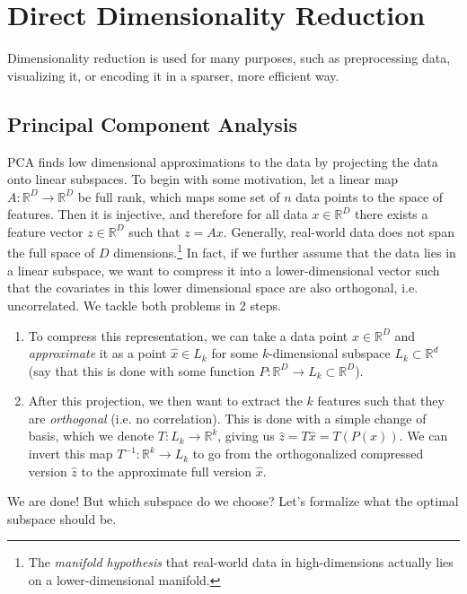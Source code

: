 \section{Direct Dimensionality Reduction} 

  Dimensionality reduction is used for many purposes, such as preprocessing data, visualizing it, or encoding it in a sparser, more efficient way. 

  \subsection{Principal Component Analysis} 
    
    PCA finds low dimensional approximations to the data by projecting the data onto linear subspaces. To begin with some motivation, let a linear map $A: \mathbb{R}^D \rightarrow \mathbb{R}^D$ be full rank, which maps some set of $n$ data points to the space of features. Then it is injective, and therefore for all data $x \in \mathbb{R}^D$ there exists a feature vector $z \in \mathbb{R}^D$ such that $z = Ax$. Generally, real-world data does not span the full space of $D$ dimensions.\footnote{The \textit{manifold hypothesis} that real-world data in high-dimensions actually lies on a lower-dimensional manifold. } In fact, if we further assume that the data lies in a linear subspace, we want to compress it into a lower-dimensional vector such that the covariates in this lower dimensional space are also orthogonal, i.e. uncorrelated. We tackle both problems in 2 steps. 
    \begin{enumerate}
      \item To compress this representation, we can take a data point $x \in \mathbb{R}^D$ and \textit{approximate} it as a point $\hat{x} \in L_k$ for some $k$-dimensional subspace $L_k \subset \mathbb{R}^d$ (say that this is done with some function $P: \mathbb{R}^D \rightarrow L_k \subset \mathbb{R}^D$). 
      \item After this projection, we then want to extract the $k$ features such that they are \textit{orthogonal} (i.e. no correlation). This is done with a simple change of basis, which we denote $T: L_k \rightarrow \mathbb{R}^k$, giving us $\hat{z} = T \hat{x} = T (P(x))$. We can invert this map $T^{-1} : \mathbb{R}^k \rightarrow L_k$ to go from the orthogonalized compressed version $\hat{z}$ to the approximate full version $\hat{x}$.
    \end{enumerate}
    We are done! But which subspace do we choose? Let's formalize what the optimal subspace should be. 

